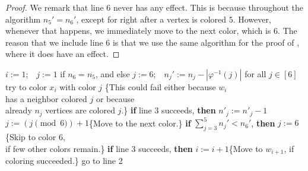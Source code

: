 \documentclass[11pt]{article}
\theoremstyle{definition}
\renewcommand\le\leqslant
\newcommand\vph\varphi
\begin{document}
\begin{proof}
	We remark that line 6 never has any effect.  This is because throughout the algorithm $n_5'=n_6'$, except for right after a vertex is colored $5$.  
	However, whenever that happens, we immediately move to the next color, which is $6$.  The reason that we include line 6 is that we use the 
	same algorithm for the proof of , where it does have an effect.
\end{proof}

\begin{minipage}{13.6cm}
\begin{algorithm}[H]
    \caption{Extending a partial coloring to an equitable $6$-coloring of $G$}
    \label{euclid}
    \begin{algorithmic}[1] %
	    \STATE $i:=1$;~~$j:=1$ if $n_6=n_5$, and else $j:=6$;~~$n_j':=n_j-|\vph^{-1}(j)|$ for all $j\in[6]$ 
	    \WHILE{$i\le d(w)$} 
		\STATE try to color $x_i$ with color $j$ \hspace{.56in}\{This could fail either because $w_i$\\ 
		\hspace{2.48in}has a neighbor colored $j$ or because\\ 
		\hspace{2.48in}already $n_j$ vertices are colored $j$.\}
		\STATE \textbf{if} line 3 succeeds, \textbf{then} $n'_j\!:=\!n'_j\!-\!1$ 
		\STATE $j:= (j\pmod{6})+1$\hspace{1.02in}\{Move to the next color.\}
		\STATE \textbf{if} $\sum_{j=3}^5n_j'<n_6'$, \textbf{then} $j:=6$\hspace{.44in}\{Skip to color 6,\\ \hspace{2.48in}if few other colors remain.\}
		\STATE \textbf{if} line 3 succeeds, \textbf{then} $i:=i+1$\hspace{.20in}\{Move to $w_{i+1}$, if coloring succeeded.\}
		\STATE go to line 2
            \ENDWHILE
    \end{algorithmic}
\end{algorithm}
\end{minipage}
\bigskip
\end{document}
